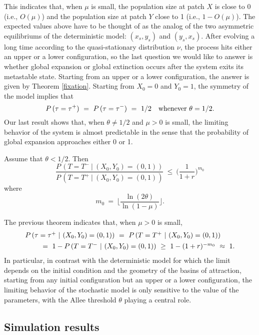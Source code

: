  This indicates that, when $\mu$ is small, the population size at patch $X$ is close to 0 (i.e., $O (\mu)$) and the population size
 at patch $Y$ close to 1 (i.e., $1- O (\mu)$).
 The expected values above have to be thought of as the analog of the two asymmetric equilibriums of the deterministic model:
 $(x_s, y_s)$ and $(y_s, x_s)$.
 After evolving a long time according to the quasi-stationary distribution $\nu$, the process hits either an upper
 or a lower configuration, so the last question we would like to answer is whether global expansion or global extinction occurs
 after the system exits its metastable state.
 Starting from an upper or a lower configuration, the answer is given by Theorem \ref{fixation}.
 Starting from $X_0 = 0$ and $Y_0 = 1$, the symmetry of the model implies that
 $$ P \,(\tau = \tau^+) \ = \ P \,(\tau = \tau^-) \ = \ 1/2 \quad \hbox{whenever} \ \theta = 1/2. $$
 Our last result shows that, when $\theta \neq 1/2$ and $\mu > 0$ is small, the limiting behavior of the system is almost
 predictable in the sense that the probability of global expansion approaches either 0 or 1.
\begin{theorem}
\label{probabilities}
 Assume that $\theta < 1/2$. Then
 $$ \frac{P \,(T = T^- \ | \ (X_0, Y_0) = (0, 1))}{P \,(T = T^+ \ | \ (X_0, Y_0) = (0, 1))} \ \leq \ \bigg(\frac{1}{1 + r} \bigg)^{m_0} $$
 where $$ m_0 \ = \ \bigg\lfloor \frac{\ln (2 \theta)}{\ln (1 - \mu)} \bigg\rfloor. $$
\end{theorem}
 The previous theorem indicates that, when $\mu > 0$ is small,
 $$ \begin{array}{l}
  P \,(\tau = \tau^+ \ | \ (X_0, Y_0) = (0, 1)) \ = \
  P \,(T = T^+ \ | \ (X_0, Y_0) = (0, 1)) \vspace{4pt} \\ \hspace{25pt} = \
  1 - P \,(T = T^- \ | \ (X_0, Y_0) = (0, 1)) \ \geq \ 1 - (1 + r)^{- m_0} \ \approx \ 1. \end{array} $$
 In particular, in contrast with the deterministic model for which the limit depends on the initial condition and the geometry of the
 basins of attraction, starting from any initial configuration but an upper or a lower configuration, the limiting behavior of the
 stochastic model is only sensitive to the value of the parameters, with the Allee threshold $\theta$ playing a central role.

\subsection{ Simulation results}

